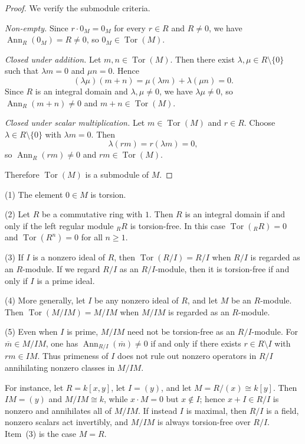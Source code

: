 \begin{proof}
    We verify the submodule criteria.

    \emph{Non-empty.}
    Since $r\cdot 0_M=0_M$ for every $r\in R$ and $R\neq 0$,
    we have $\operatorname{Ann}_R(0_M)=R\neq 0$, so $0_M\in\operatorname{Tor}(M)$.

    \emph{Closed under addition.}
    Let $m,n\in\operatorname{Tor}(M)$.
    Then there exist $\lambda,\mu\in R\setminus\{0\}$ such that $\lambda m=0$ and $\mu n=0$.
    Hence
    \[
        (\lambda\mu)(m+n)=\mu(\lambda m)+\lambda(\mu n)=0.
    \]
    Since $R$ is an integral domain and $\lambda,\mu\neq 0$, we have $\lambda\mu\neq 0$,
    so $\operatorname{Ann}_R(m+n)\neq 0$ and $m+n\in\operatorname{Tor}(M)$.

    \emph{Closed under scalar multiplication.}
    Let $m\in\operatorname{Tor}(M)$ and $r\in R$.
    Choose $\lambda\in R\setminus\{0\}$ with $\lambda m=0$. Then
    \[
        \lambda(rm)=r(\lambda m)=0,
    \]
    so $\operatorname{Ann}_R(rm)\neq 0$ and $rm\in\operatorname{Tor}(M)$.

    Therefore $\operatorname{Tor}(M)$ is a submodule of $M$.
\end{proof}

\begin{example}
    (1) The element $0 \in M$ is torsion.

    (2) Let $R$ be a commutative ring with $1$. Then $R$ is an integral domain if and only if the left regular module ${}_R R$ is torsion-free. In this case $\operatorname{Tor}({}_R R)=0$ and $\operatorname{Tor}(R^n)=0$ for all $n \ge 1$.

    (3) If $I$ is a nonzero ideal of $R$, then $\operatorname{Tor}(R/I)=R/I$ when $R/I$ is regarded as an $R$-module. If we regard $R/I$ as an $R/I$-module, then it is torsion-free if and only if $I$ is a prime ideal.

    (4) More generally, let $I$ be any nonzero ideal of $R$, and let $M$ be an $R$-module. Then $\operatorname{Tor}(M/IM)=M/IM$ when $M/IM$ is regarded as an $R$-module.

    (5) Even when $I$ is prime, $M/IM$ need not be torsion-free as an $R/I$-module. For $\overline{m}\in M/IM$, one has $\operatorname{Ann}_{R/I}(\overline{m})\neq 0$ if and only if there exists $r\in R\setminus I$ with $rm\in IM$. Thus primeness of $I$ does not rule out nonzero operators in $R/I$ annihilating nonzero classes in $M/IM$.

    For instance, let $R=k[x,y]$, let $I=(y)$, and let $M=R/(x)\cong k[y]$. Then $IM=(y)$ and $M/IM\cong k$, while $x\cdot M=0$ but $x\notin I$; hence $x+I\in R/I$ is nonzero and annihilates all of $M/IM$.
    If instead $I$ is maximal, then $R/I$ is a field, nonzero scalars act invertibly, and $M/IM$ is always torsion-free over $R/I$.
    Item~\textup{(3)} is the case $M=R$.
\end{example}

